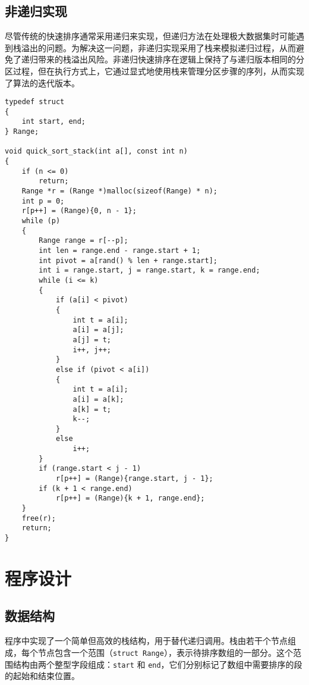 \documentclass[12pt]{article}
\begin{document}
\subsection{非递归实现}

尽管传统的快速排序通常采用递归来实现，但递归方法在处理极大数据集时可能遇到栈溢出的问题。为解决这一问题，非递归实现采用了栈来模拟递归过程，从而避免了递归带来的栈溢出风险。非递归快速排序在逻辑上保持了与递归版本相同的分区过程，但在执行方式上，它通过显式地使用栈来管理分区步骤的序列，从而实现了算法的迭代版本。

{\setmainfont{Consolas} %
\begin{lstlisting}
typedef struct
{
    int start, end;
} Range;

void quick_sort_stack(int a[], const int n)
{
    if (n <= 0)
        return;
    Range *r = (Range *)malloc(sizeof(Range) * n);
    int p = 0;
    r[p++] = (Range){0, n - 1};
    while (p)
    {
        Range range = r[--p];
        int len = range.end - range.start + 1;
        int pivot = a[rand() % len + range.start];
        int i = range.start, j = range.start, k = range.end;
        while (i <= k)
        {
            if (a[i] < pivot)
            {
                int t = a[i];
                a[i] = a[j];
                a[j] = t;
                i++, j++;
            }
            else if (pivot < a[i])
            {
                int t = a[i];
                a[i] = a[k];
                a[k] = t;
                k--;
            }
            else
                i++;
        }
        if (range.start < j - 1)
            r[p++] = (Range){range.start, j - 1};
        if (k + 1 < range.end)
            r[p++] = (Range){k + 1, range.end};
    }
    free(r);
    return;
}
\end{lstlisting}
}

\newpage

\section{程序设计}

\subsection{数据结构}

程序中实现了一个简单但高效的栈结构，用于替代递归调用。栈由若干个节点组成，每个节点包含一个范围（\verb|struct Range|），表示待排序数组的一部分。这个范围结构由两个整型字段组成：\verb|start| 和 \verb|end|，它们分别标记了数组中需要排序的段的起始和结束位置。
\end{document}
